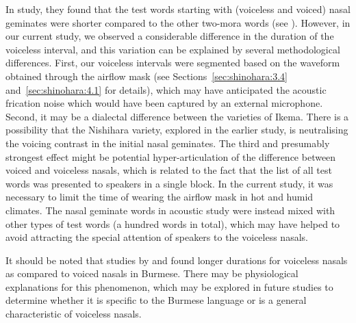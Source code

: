 \documentclass[output=paper]{langscibook}
\begin{document}
In  study, they found that the test words starting with (voiceless and voiced) nasal geminates were shorter compared to the other two-mora words (see ). However, in our current study, we observed a considerable difference in the duration of the voiceless interval, and this variation can be explained by several methodological differences. First, our voiceless intervals were segmented based on the waveform obtained through the airflow mask (see Sections~\ref{sec:shinohara:3.4} and~\ref{sec:shinohara:4.1} for details), which may have anticipated the acoustic frication noise which would have been captured by an external microphone. Second, it may be a dialectal difference between the varieties of Ikema. There is a possibility that the Nishihara variety, explored in the earlier study, is neutralising the voicing contrast in the initial nasal geminates. The third and presumably strongest effect might be potential hyper-articulation of the difference between voiced and voiceless nasals, which is related to the fact that the list of all test words was presented to speakers in a single block. In the current study, it was necessary to limit the time of wearing the airflow mask in hot and humid climates. The nasal geminate words in  acoustic study were instead mixed with other types of test words (a hundred words in total), which may have helped to avoid attracting the special attention of speakers to the voiceless nasals.

It should be noted that studies by \citet{LadefogedMaddieson1996} and \citet{ChirkovaEtAl2019} found longer durations for voiceless nasals as compared to voiced nasals in Burmese. There may be physiological explanations for this phenomenon, which may be explored in future studies to determine whether it is specific to the Burmese language or is a general characteristic of voiceless nasals.
\end{document}

